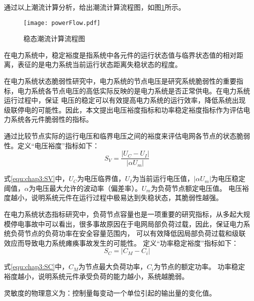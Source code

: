 通过以上潮流计算分析，给出潮流计算流程图，如图\ref{fig:powerFlow}所示。
\begin{figure}[H] %
  \centering
  \texttt{[image: powerFlow.pdf]}
  \caption{稳态潮流计算流程图}
  \label{fig:powerFlow}
\end{figure}



在电力系统中，稳定裕度是指系统中各元件的运行状态值与临界状态值的相对距离，表征的是电力系统当前运行状态距离失稳状态的程度。

在电力系统状态脆弱性研究中，电力系统的节点电压是研究系统脆弱性的重要指标，电力系统各节点电压的高低实际反映的是电力系统是否正常供电。在电力系统运行过程中，保证
电压的稳定可以有效提高电力系统的运行效率，降低系统出现级联停电的可能性。因此，本文提出电压裕度指标和功率稳定裕度指标作为评估电力系统各元件脆弱性的指标。

通过比较节点实际的运行电压和临界电压之间的裕度来评估电网各节点的状态脆弱性。定义“电压裕度”指标如下：
\begin{equation}
\label{equ:chap3:SV}
  S_V=\frac{\left|U_{C}-U_{I}\right|}{\left|\alpha U_{m}\right|}
\end{equation}

式\ref{equ:chap3:SV}中，$U_C$为电压临界值，$U_I$为当前运行电压值，$\left|\alpha U_{m}\right|$为电压稳定阈值，$\alpha$为电压最大允许的波动率（偏差率）。$U_m$为负荷节点额定电压值。
电压裕度越小，说明系统元件在运行过程中极易达到失稳状态，其脆弱性越强。

在电力系统状态指标研究中，负荷节点容量也是一项重要的研究指标，从多起大规模停电事故中可以看出，很多事故原因在于电网局部负荷过载，因此，保证电力系统负荷节点的负荷功率在安全容量范围内，
可以有效降低因局部负荷过载和级联效应而导致电力系统瘫痪事故发生的可能性。
定义“功率稳定裕度”指标如下：
\begin{equation}
\label{equ:chap3:SC}
  S_C=\left|C_M-C_i\right|
  \end{equation}

式\ref{equ:chap3:SC}中，$C_M$为节点最大负荷功率，$C_i$为节点的额定功率。
功率稳定裕度越小，说明系统元件承受负荷的能力越小，系统越脆弱。

灵敏度的物理意义为：控制量每变动一个单位引起的输出量的变化值。

